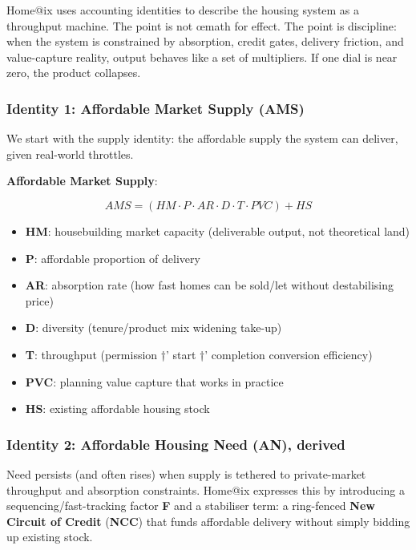 \documentclass[
]{article}
\providecommand{\tightlist}{%
  \setlength{\itemsep}{0pt}\setlength{\parskip}{0pt}}
\begin{document}
Home@ix uses accounting identities to describe the housing system as a
throughput machine. The point is not œmath for effect. The point is
discipline: when the system is constrained by absorption, credit gates,
delivery friction, and value-capture reality, output behaves like a set
of multipliers. If one dial is near zero, the product collapses.

\protect{}\label{homeix-identity-ams}
\subsubsection{Identity 1: Affordable Market Supply
(AMS)}\label{identity-1-affordable-market-supply-ams}

We start with the supply identity: the affordable supply the system can
deliver, given real-world throttles.

\textbf{Affordable Market Supply}:

\[AMS = (HM \cdot P \cdot AR \cdot D \cdot T \cdot PVC) + HS\]

\begin{itemize}
\tightlist
\item
  \textbf{HM}: housebuilding market capacity (deliverable output, not
  theoretical land)
\item
  \textbf{P}: affordable proportion of delivery
\item
  \textbf{AR}: absorption rate (how fast homes can be sold/let without
  destabilising price)
\item
  \textbf{D}: diversity (tenure/product mix widening take-up)
\item
  \textbf{T}: throughput (permission †' start †' completion conversion
  efficiency)
\item
  \textbf{PVC}: planning value capture that works in practice
\item
  \textbf{HS}: existing affordable housing stock
\end{itemize}

\protect{}\label{homeix-identity-an}
\subsubsection{Identity 2: Affordable Housing Need (AN),
derived}\label{identity-2-affordable-housing-need-an-derived}

Need persists (and often rises) when supply is tethered to
private-market throughput and absorption constraints. Home@ix expresses
this by introducing a sequencing/fast-tracking factor \textbf{F} and a
stabiliser term: a ring-fenced \textbf{New Circuit of Credit}
(\textbf{NCC}) that funds affordable delivery without simply bidding up
existing stock.
\end{document}
